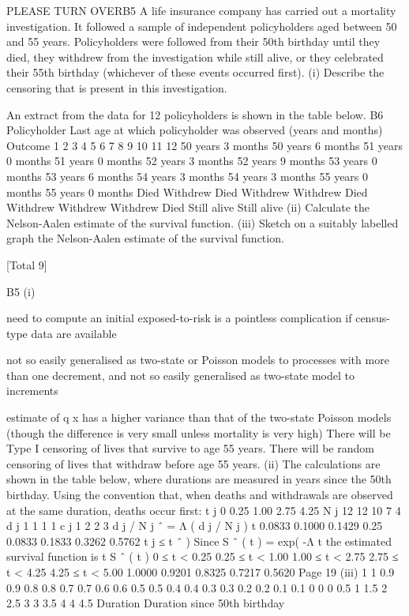 \documentclass[a4paper,12pt]{article}
\begin{document}
PLEASE TURN OVERB5
A life insurance company has carried out a mortality investigation. It followed a
sample of independent policyholders aged between 50 and 55 years. Policyholders
were followed from their 50th birthday until they died, they withdrew from the
investigation while still alive, or they celebrated their 55th birthday (whichever of
these events occurred first).
(i)
Describe the censoring that is present in this investigation.

An extract from the data for 12 policyholders is shown in the table below.
B6
Policyholder Last age at which
policyholder was observed
(years and months) Outcome
1
2
3
4
5
6
7
8
9
10
11
12 50 years 3 months
50 years 6 months
51 years 0 months
51 years 0 months
52 years 3 months
52 years 9 months
53 years 0 months
53 years 6 months
54 years 3 months
54 years 3 months
55 years 0 months
55 years 0 months Died
Withdrew
Died
Withdrew
Withdrew
Died
Withdrew
Withdrew
Withdrew
Died
Still alive
Still alive
(ii) Calculate the Nelson-Aalen estimate of the survival function.
(iii) Sketch on a suitably labelled graph the Nelson-Aalen estimate of the survival
function.

[Total 9]



B5
(i)
\item  need to compute an initial exposed-to-risk is a pointless complication if
census-type data are available
\item  not so easily generalised as two-state or Poisson models to processes with
more than one decrement, and not so easily generalised as two-state model
to increments
\item  estimate of q x has a higher variance than that of the two-state Poisson
models (though the difference is very small unless mortality is very high)
There will be Type I censoring of lives that survive to age 55 years.
There will be random censoring of lives that withdraw before age 55 years.
(ii)
The calculations are shown in the table below, where durations are measured
in years since the 50th birthday.
Using the convention that, when deaths and withdrawals are observed at the
same duration, deaths occur first:
t j
0
0.25
1.00
2.75
4.25
N j
12
12
10
7
4
d j
1
1
1
1
c j
1
2
2
3
d j / N j ˆ =
Λ
\sum  ( d j / N j )
t
0.0833
0.1000
0.1429
0.25 0.0833
0.1833
0.3262
0.5762
t j ≤ t
ˆ )
Since S ˆ ( t ) = exp( -Λ
t
the estimated survival function is
t S ˆ ( t )
0 ≤ t < 0.25
0.25 ≤ t < 1.00
1.00 ≤ t < 2.75
2.75 ≤ t < 4.25
4.25 ≤ t < 5.00 1.0000
0.9201
0.8325
0.7217
0.5620
Page 19
(iii)
1 1
0.9
0.9
0.8
0.8
0.7
0.7
0.6
0.6
0.5
0.5
0.4
0.4
0.3
0.3
0.2
0.2
0.1
0.1
0 0
0
0.5
1
1.5
2
2.5
3 3
3.5
4 4
4.5
Duration
Duration since 50th birthday
\end{document}
